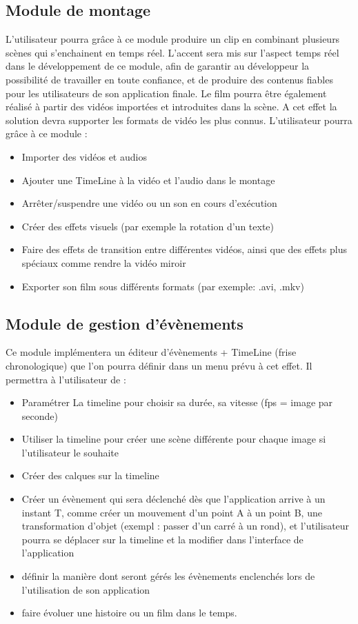 \documentclass{ultimaade-fr}
\begin{document}
\subsection{Module de montage}
L’utilisateur pourra grâce à ce module produire un clip en combinant plusieurs scènes qui s’enchainent en temps réel.
L’accent sera mis sur l’aspect temps réel dans le développement de ce module, afin de garantir au développeur la possibilité de travailler en toute confiance, et de produire des
contenus fiables pour les utilisateurs de son application finale.
Le film pourra être également réalisé à partir des vidéos importées et introduites dans la scène. A cet effet la solution devra supporter les formats de vidéo les plus connus.
L’utilisateur pourra grâce à ce module :
\begin{itemize}
\item Importer des vidéos et audios
\item Ajouter une TimeLine à la vidéo et l'audio dans le montage
\item Arrêter/suspendre une vidéo ou un son en cours d'exécution
\item Créer des effets visuels (par exemple la rotation d'un texte)
\item Faire des effets de transition entre différentes vidéos, ainsi que des effets plus spéciaux comme rendre la vidéo miroir
\item Exporter son film sous différents formats (par exemple: .avi, .mkv)
\end{itemize}

\subsection{Module de gestion d’évènements}
Ce module implémentera un éditeur d’évènements + TimeLine (frise chronologique)  que l’on pourra définir dans un menu prévu à cet effet. Il permettra à l’utilisateur de :
\begin{itemize}
\item Paramétrer La timeline pour choisir sa durée, sa vitesse (fps = image par seconde)
\item Utiliser la timeline pour créer une scène différente pour chaque image si l’utilisateur le souhaite
\item Créer des calques sur la timeline
\item Créer un évènement qui sera déclenché dès que l’application arrive à un instant T, comme créer un mouvement d’un point A à un point B, une transformation d’objet (exempl : passer d’un carré à un rond), et l’utilisateur pourra se déplacer sur la timeline et la modifier dans l'interface de l'application
\item définir la manière dont seront gérés les évènements enclenchés lors de l’utilisation de son application
\item faire évoluer une histoire ou un film dans le temps.
\end{itemize}
\end{document}
